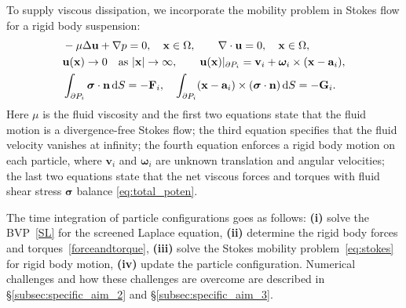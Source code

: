 To supply viscous dissipation, we incorporate the mobility problem in
Stokes flow for a rigid body suspension:
\begin{equation}
\label{eq:stokes}
\begin{aligned}
  &-\mu \Delta \mathbf{u} + \nabla p = 0, \quad \mathbf{x} \in \Omega, \qquad 
  \nabla \cdot \mathbf{u} = 0,  \quad \mathbf{x} \in \Omega,\\
  &{\bf u}(\mathbf{x}) \to 0 \quad \text{as}\ |\mathbf{x}|\to \infty,\qquad 
  \mathbf{u}(\mathbf{x})|_{\partial P_i} = \mathbf{v}_i +
\boldsymbol{\omega}_i\times(\mathbf{x} - \mathbf{a}_i),\\
&\int_{\partial P_i}\boldsymbol{\sigma}\cdot {\bf n} \dif S=-{\bf F}_i, \quad
\int_{\partial P_i} (\mathbf{x} - \mathbf{a}_i)\times (\boldsymbol{\sigma} \cdot \mathbf{n}) \dif S =-{\bf G}_i.
\end{aligned}
\end{equation}
Here $\mu$ is the fluid viscosity and the first two equations state that
the fluid motion is a divergence-free Stokes flow; the third equation
specifies that the fluid velocity vanishes at infinity; the fourth
equation enforces a rigid body motion on each particle, where
$\mathbf{v}_i$ and $\boldsymbol{\omega}_i$ are unknown translation and
angular velocities; the last two equations state that the net
viscous forces and torques with fluid shear stress $\boldsymbol{\sigma}$
balance \eqref{eq:total_poten}.



The time integration of
particle configurations goes as follows: \textbf{(i)} solve the
BVP~\eqref{SL} for the screened Laplace equation, \textbf{(ii)}
determine the rigid body forces and torques~\eqref{forceandtorque},
\textbf{(iii)} solve the Stokes mobility problem~\eqref{eq:stokes} for
rigid body motion, \textbf{(iv)} update the particle configuration.
Numerical challenges and how these challenges are overcome are described
in \S\ref{subsec:specific_aim_2} and \S\ref{subsec:specific_aim_3}.


